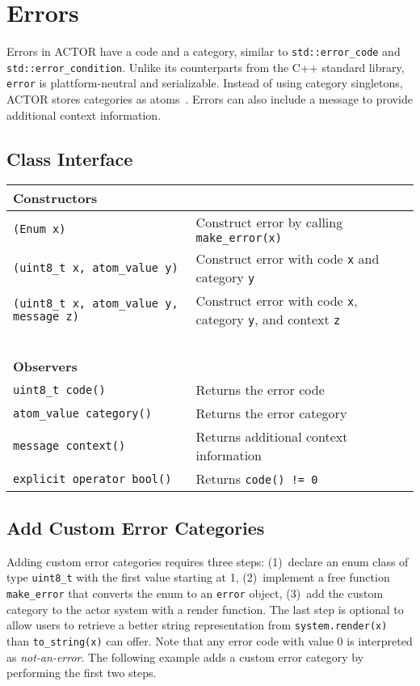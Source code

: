 \section{Errors}
\label{error}

Errors in ACTOR have a code and a category, similar to
\lstinline^std::error_code^ and \lstinline^std::error_condition^. Unlike its
counterparts from the C++ standard library, \lstinline^error^ is
plattform-neutral and serializable. Instead of using category singletons, ACTOR
stores categories as atoms~. Errors can also include a message to
provide additional context information.

\subsection{Class Interface}

\begin{center}
\begin{tabular}{ll}
  \textbf{Constructors} & ~ \\
  \hline
  \lstinline^(Enum x)^ & Construct error by calling \lstinline^make_error(x)^ \\
  \hline
  \lstinline^(uint8_t x, atom_value y)^ & Construct error with code \lstinline^x^ and category \lstinline^y^ \\
  \hline
  \lstinline^(uint8_t x, atom_value y, message z)^ & Construct error with code \lstinline^x^, category \lstinline^y^, and context \lstinline^z^ \\
  \hline
  ~ & ~ \\ \textbf{Observers} & ~ \\
  \hline
  \lstinline^uint8_t code()^ & Returns the error code \\
  \hline
  \lstinline^atom_value category()^ & Returns the error category \\
  \hline
  \lstinline^message context()^ & Returns additional context information \\
  \hline
  \lstinline^explicit operator bool()^ & Returns \lstinline^code() != 0^ \\
  \hline
\end{tabular}
\end{center}

\subsection{Add Custom Error Categories}
\label{custom-error}

Adding custom error categories requires three steps: (1)~declare an enum class
of type \lstinline^uint8_t^ with the first value starting at 1, (2)~implement a
free function \lstinline^make_error^ that converts the enum to an
\lstinline^error^ object, (3)~add the custom category to the actor system with
a render function. The last step is optional to allow users to retrieve a
better string representation from \lstinline^system.render(x)^ than
\lstinline^to_string(x)^ can offer. Note that any error code with value 0 is
interpreted as \emph{not-an-error}. The following example adds a custom error
category by performing the first two steps.

